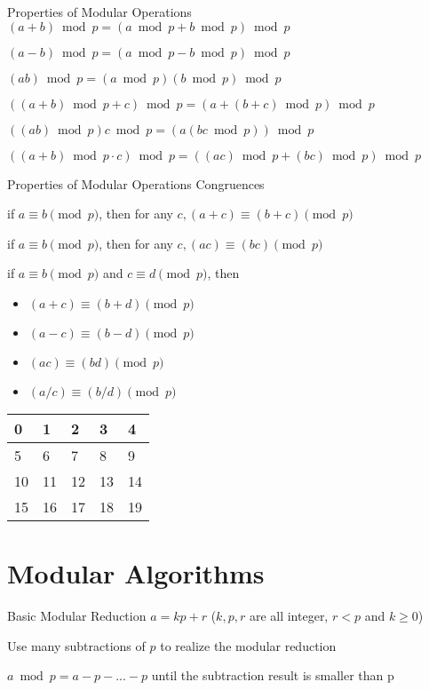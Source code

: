 \documentclass{beamer}
\begin{document}
\begin{frame}{Properties of Modular Operations}	
$(a + b) \bmod p = (a \bmod p + b \bmod p) \bmod p$

$(a - b) \bmod p = (a \bmod p - b \bmod p) \bmod p$

$(a  b) \bmod p = (a \bmod p)   (b \bmod p) \bmod p$

$((a + b) \bmod p + c) \bmod p = (a + (b + c) \bmod p) \bmod p$

	$((a  b) \bmod p)  c \bmod p = (a  (b  c \bmod p)) \bmod p$

	$((a +b) \bmod p \cdot c) \bmod p = ((a  c) \bmod p + (b  c) \bmod p) \bmod p $
\end{frame}

\begin{frame}{Properties of Modular Operations}	
	\alert{Congruences}

	if $a \equiv b \pmod p$, then for any $c, (a + c) \equiv (b + c) \pmod p$
	
	if $a \equiv b \pmod p$, then for any $c, (a  c) \equiv (b  c) \pmod p$
	
	if $a \equiv b \pmod p$ and $c \equiv d \pmod p$, then  
		\begin{itemize}
			\item	$(a + c) \equiv (b + d) \pmod p$
			\item	$(a - c) \equiv (b - d) \pmod p$
			\item   $(a  c) \equiv (b  d) \pmod p$
			\item   $(a / c) \equiv (b / d) \pmod p$
		\end{itemize}
	
		\begin{table}[]
\begin{tabular}{|l|l|l|l|l|}
\hline
0  & 1  & 2  & 3  & 4  \\ \hline
5  & 6  & 7  & 8  & 9  \\ \hline
10 & 11 & 12 & 13 & 14 \\ \hline
15 & 16 & 17 & 18 & 19 \\ \hline
\end{tabular}
\end{table}
\end{frame}

\section{Modular Algorithms}
\begin{frame}{Basic Modular Reduction}
$a = kp + r$ ($k,p,r$ are all integer, $r < p$ and $k \geq 0$)

	Use many \alert{subtractions} of $p$ to realize the modular reduction

	\hspace*{\fill}

	$a \bmod p = a - p - ... - p$ until the subtraction result is smaller than p

\end{frame}	
\end{document}
